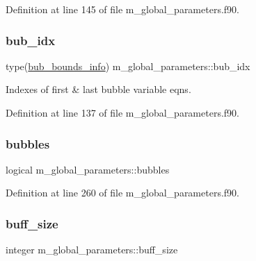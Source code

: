 Definition at line 145 of file m\+\_\+global\+\_\+parameters.\+f90.

\mbox{\label{namespacem__global__parameters_a9a425d1bd91d1765043adf8410b98bf7}} 
\subsubsection{\texorpdfstring{bub\+\_\+idx}{bub\_idx}}
{\footnotesize\ttfamily type(\hyperlink{structm__derived__types_1_1bub__bounds__info}{bub\+\_\+bounds\+\_\+info}) m\+\_\+global\+\_\+parameters\+::bub\+\_\+idx}



Indexes of first \& last bubble variable eqns. 



Definition at line 137 of file m\+\_\+global\+\_\+parameters.\+f90.

\mbox{\label{namespacem__global__parameters_a4a22ed160838f8fbe6bd506f334b8815}} 
\subsubsection{\texorpdfstring{bubbles}{bubbles}}
{\footnotesize\ttfamily logical m\+\_\+global\+\_\+parameters\+::bubbles}



Definition at line 260 of file m\+\_\+global\+\_\+parameters.\+f90.

\mbox{\label{namespacem__global__parameters_a6e342ae3eb66f89e0eeb94e11aa42d92}} 
\subsubsection{\texorpdfstring{buff\+\_\+size}{buff\_size}}
{\footnotesize\ttfamily integer m\+\_\+global\+\_\+parameters\+::buff\+\_\+size}



